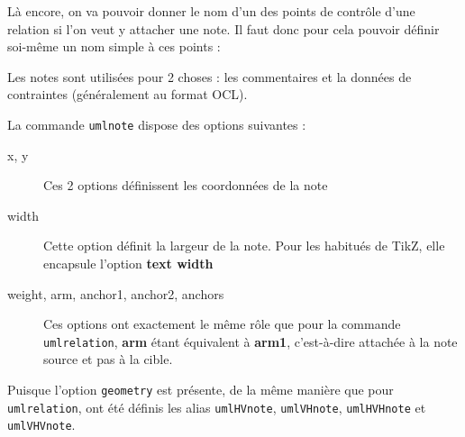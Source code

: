 \documentclass[a4paper,11pt]{report}
\newcommand{\inputTikZ}[1]{%
  }%
\newcommand{\inputTikZ}[1]{%
    \texttt{[image: fig/\#1.pdf]}%
  }%
\begin{document}
\medskip

Là encore, on va pouvoir donner le nom d'un des points de contrôle d'une relation si l'on veut y attacher une note. Il faut donc pour cela pouvoir définir soi-même un nom simple à ces points :

\medskip

\begin{minipage}{0.6\textwidth}

\end{minipage}
\begin{minipage}{0.4\textwidth}
\begin{center}
\inputTikZ{figure30}
\end{center}
\end{minipage}

\medskip

\medskip

Les notes sont utilisées pour 2 choses : les commentaires et la données de contraintes (généralement au format OCL).

\medskip

La commande {\tt umlnote} dispose des options suivantes :

\begin{description}
\item[x, y] Ces 2 options définissent les coordonnées de la note
\item[width] Cette option définit la largeur de la note. Pour les habitués de TikZ, elle encapsule l'option {\bf text width}
\item[weight, arm, anchor1, anchor2, anchors] Ces options ont exactement le même rôle que pour la commande {\tt umlrelation}, {\bf arm} étant équivalent à {\bf arm1}, c'est-à-dire attachée à la note source et pas à la cible. 
\end{description}

\medskip

\begin{minipage}{0.6\textwidth}

\end{minipage}
\begin{minipage}{0.4\textwidth}
\begin{center}
\inputTikZ{figure31}
\end{center}
\end{minipage}

\medskip

\medskip

Puisque l'option {\tt geometry} est présente, de la même manière que pour {\tt umlrelation}, ont été définis les alias {\tt umlHVnote}, {\tt umlVHnote}, {\tt umlHVHnote} et {\tt umlVHVnote}.
\end{document}
